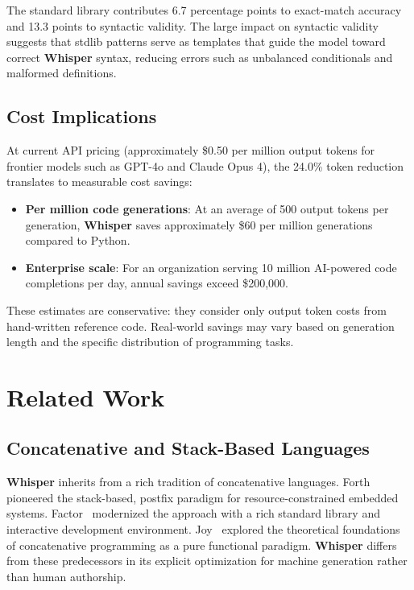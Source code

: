 \documentclass[11pt,a4paper]{article}
\begin{document}
The standard library contributes 6.7 percentage points to exact-match
accuracy and 13.3 points to syntactic validity. The large impact on
syntactic validity suggests that stdlib patterns serve as templates
that guide the model toward correct \textbf{Whisper} syntax, reducing
errors such as unbalanced conditionals and malformed definitions.

\subsection{Cost Implications}

At current API pricing (approximately \$0.50 per million output tokens for
frontier models such as GPT-4o and Claude Opus 4), the 24.0\% token
reduction translates to measurable cost savings:

\begin{itemize}
\item \textbf{Per million code generations}: At an average of 500 output
  tokens per generation, \textbf{Whisper} saves approximately \$60 per
  million generations compared to Python.
\item \textbf{Enterprise scale}: For an organization serving 10 million
  AI-powered code completions per day, annual savings exceed \$200,000.
\end{itemize}

These estimates are conservative: they consider only output token costs
from hand-written reference code. Real-world savings may vary based on
generation length and the specific distribution of programming tasks.

\section{Related Work}
\label{sec:related}

\subsection{Concatenative and Stack-Based Languages}

\textbf{Whisper} inherits from a rich tradition of concatenative languages.
Forth~\cite{forth} pioneered the stack-based, postfix paradigm for
resource-constrained embedded systems. Factor~\cite{factor} modernized the
approach with a rich standard library and interactive development environment.
Joy~\cite{joy} explored the theoretical foundations of concatenative
programming as a pure functional paradigm. \textbf{Whisper} differs from these
predecessors in its explicit optimization for machine generation rather than
human authorship.
\end{document}
